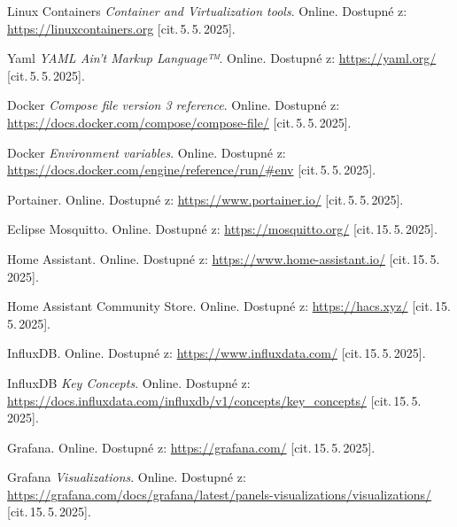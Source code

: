 \begin{thebibliography}{99}
		Linux Containers \emph{Container and Virtualization tools}.\/ Online.
		Dostupné z:
	\url{https://linuxcontainers.org}
		[cit.\,5.\,5.\,2025].

		Yaml \emph{YAML Ain't Markup Language™}.\/ Online. 
		Dostupné z:
	\url{https://yaml.org/}
		[cit.\,5.\,5.\,2025].

		Docker \emph{Compose file version 3 reference}.\/ Online. 
		Dostupné z:
	\url{https://docs.docker.com/compose/compose-file/}
		[cit.\,5.\,5.\,2025].

		Docker \emph{Environment variables}.\/ Online. 
		Dostupné z:
	\url{https://docs.docker.com/engine/reference/run/#env}
		[cit.\,5.\,5.\,2025].

		Portainer.\/ Online. 
		Dostupné z:
	\url{https://www.portainer.io/}
		[cit.\,5.\,5.\,2025].

		Eclipse Mosquitto.\/ Online. 
		Dostupné z:
	\url{https://mosquitto.org/}
		[cit.\,15.\,5.\,2025].

		Home Assistant.\/ Online. 
		Dostupné z:
	\url{https://www.home-assistant.io/}
		[cit.\,15.\,5.\,2025].

		Home Assistant Community Store.\/ Online. 
		Dostupné z:
	\url{https://hacs.xyz/}
		[cit.\,15.\,5.\,2025].

		InfluxDB.\/ Online. 
		Dostupné z:
	\url{https://www.influxdata.com/}
		[cit.\,15.\,5.\,2025].

		InfluxDB \emph{Key Concepts}.\/ Online. 
		Dostupné z:
	\url{https://docs.influxdata.com/influxdb/v1/concepts/key_concepts/}
		[cit.\,15.\,5.\,2025].

		Grafana.\/ Online. 
		Dostupné z:
	\url{https://grafana.com/}
		[cit.\,15.\,5.\,2025].

		Grafana \emph{Visualizations}.\/ Online. 
		Dostupné z:
	\url{https://grafana.com/docs/grafana/latest/panels-visualizations/visualizations/}
		[cit.\,15.\,5.\,2025].
\end{thebibliography} 
%
%
%
